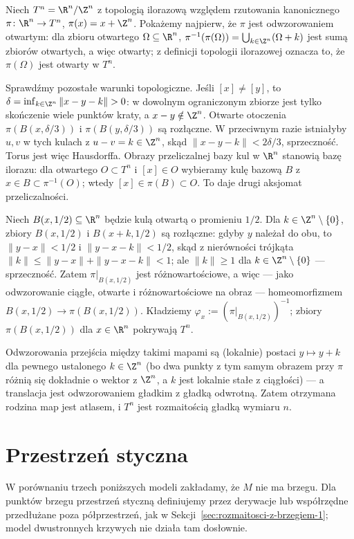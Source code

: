 \begin{przyklad}[Torus $T^n$]\label{prz:torus}
Niech $T^n=\R^n/\Z^n$ z topologią ilorazową względem rzutowania kanonicznego $\pi\colon\R^n
\to T^n$, $\pi(x)=x+\Z^n$. Pokażemy najpierw, że $\pi$ jest odwzorowaniem otwartym: dla
zbioru otwartego $\Omega\subseteq\R^n$, $\pi^{-1}(\pi(\Omega))=\bigcup_{k\in\Z^n}(\Omega+k)$
jest sumą zbiorów otwartych, a więc otwarty; z definicji topologii ilorazowej oznacza to,
że $\pi(\Omega)$ jest otwarty w $T^n$.

Sprawdźmy pozostałe warunki topologiczne. Jeśli $[x]\ne[y]$, to
$\delta=\inf_{k\in\Z^n}\|x-y-k\|>0$: w dowolnym ograniczonym
zbiorze jest tylko skończenie wiele punktów kraty, a $x-y\notin\Z^n$.
Otwarte otoczenia $\pi(B(x,\delta/3))$ i $\pi(B(y,\delta/3))$
są rozłączne. W przeciwnym razie istniałyby $u,v$ w tych kulach
z $u-v=k\in\Z^n$, skąd $\|x-y-k\|<2\delta/3$, sprzeczność.
Torus jest więc Hausdorffa. Obrazy przeliczalnej bazy kul w $\R^n$
stanowią bazę ilorazu: dla otwartego $O\subset T^n$ i $[x]\in O$
wybieramy kulę bazową $B$ z $x\in B\subset\pi^{-1}(O)$;
wtedy $[x]\in\pi(B)\subset O$. To daje drugi aksjomat przeliczalności.

Niech $B(x,1/2)\subseteq\R^n$ będzie kulą otwartą o promieniu $1/2$. Dla $k\in\Z^n\setminus
\{0\}$, zbiory $B(x,1/2)$ i $B(x+k,1/2)$ są rozłączne: gdyby $y$ należał do obu, to
$\|y-x\|<1/2$ i $\|y-x-k\|<1/2$, skąd z nierówności trójkąta $\|k\|\leq\|y-x\|+\|y-x-k\|<1$;
ale $\|k\|\geq1$ dla $k\in\Z^n\setminus\{0\}$ — sprzeczność. Zatem $\pi|_{B(x,1/2)}$ jest
różnowartościowe, a więc — jako odwzorowanie ciągłe, otwarte i różnowartościowe na obraz —
homeomorfizmem $B(x,1/2)\to\pi(B(x,1/2))$. Kładziemy $\varphi_x:=(\pi|_{B(x,1/2)})^{-1}$;
zbiory $\pi(B(x,1/2))$ dla $x\in\R^n$ pokrywają $T^n$.

Odwzorowania przejścia między takimi mapami są (lokalnie) postaci $y\mapsto y+k$ dla
pewnego ustalonego $k\in\Z^n$ (bo dwa punkty z tym samym obrazem przy $\pi$ różnią się
dokładnie o wektor z $\Z^n$, a $k$ jest lokalnie stałe z ciągłości) — a translacja jest
odwzorowaniem gładkim z gładką odwrotną. Zatem otrzymana rodzina map jest atlasem, i $T^n$
jest rozmaitością gładką wymiaru $n$.
\end{przyklad}
\section{Przestrzeń styczna}\label{sec:przestrzen-styczna}

W porównaniu trzech poniższych modeli zakładamy,
że $M$ nie ma brzegu. Dla punktów brzegu
przestrzeń styczną definiujemy przez derywacje
lub współrzędne przedłużane poza półprzestrzeń,
jak w Sekcji~\ref{sec:rozmaitosci-z-brzegiem-1};
model dwustronnych krzywych nie działa tam dosłownie.

